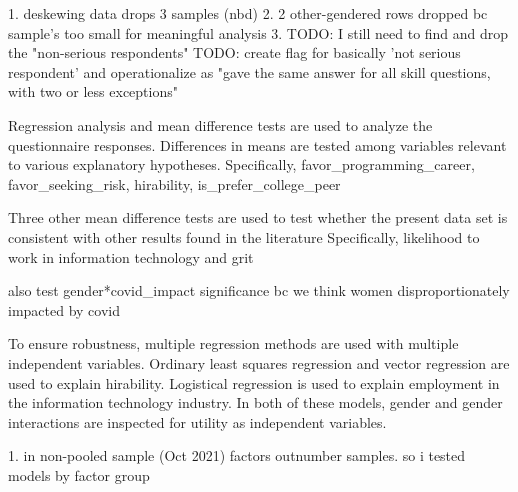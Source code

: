 \documentclass[review]{elsarticle}
\begin{document}


1. deskewing data drops 3 samples (nbd)
2. 2 other-gendered rows dropped bc sample's too small for meaningful analysis
3. TODO: I still need to find and drop the "non-serious respondents"
TODO: create flag for basically 'not serious respondent' and operationalize as "gave the same answer for all skill questions, with two or less exceptions"

Regression analysis and mean difference tests are used to analyze the questionnaire responses.
Differences in means are tested among variables relevant to various explanatory hypotheses.
Specifically, favor_programming_career, favor_seeking_risk, hirability, is_prefer_college_peer

Three other mean difference tests are used to test whether the present data set is consistent with other results found in the literature
Specifically, likelihood to work in information technology and grit

also test gender*covid_impact significance bc we think women disproportionately impacted by covid

To ensure robustness, multiple regression methods are used with multiple independent variables.
Ordinary least squares regression and vector regression are used to explain hirability.
Logistical regression is used to explain employment in the information technology industry.
In both of these models, gender and gender interactions are inspected for utility as independent variables.



1. in non-pooled sample (Oct 2021) factors outnumber samples. so i tested models by factor group
\end{document}
